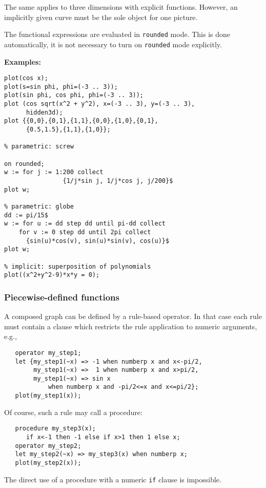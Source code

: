 The same applies to three dimensions with explicit functions. However, an
implicitly given curve must be the sole object for one picture.

The functional expressions are evaluated in \texttt{rounded} mode.
This is done automatically, it is not necessary to turn on
\texttt{rounded} mode explicitly.

\textbf{Examples:}
\begin{verbatim}
plot(cos x);
plot(s=sin phi, phi=(-3 .. 3));
plot(sin phi, cos phi, phi=(-3 .. 3));
plot (cos sqrt(x^2 + y^2), x=(-3 .. 3), y=(-3 .. 3),
      hidden3d);
plot {{0,0},{0,1},{1,1},{0,0},{1,0},{0,1},
      {0.5,1.5},{1,1},{1,0}};

% parametric: screw

on rounded;
w := for j := 1:200 collect
                {1/j*sin j, 1/j*cos j, j/200}$
plot w;

% parametric: globe
dd := pi/15$
w := for u := dd step dd until pi-dd collect
    for v := 0 step dd until 2pi collect
      {sin(u)*cos(v), sin(u)*sin(v), cos(u)}$
plot w;

% implicit: superposition of polynomials
plot((x^2+y^2-9)*x*y = 0);
\end{verbatim}


\subsubsection{Piecewise-defined functions}
A composed graph can be defined by a rule-based operator.  In that case each
rule must contain a clause which restricts the rule application to numeric
arguments, e.g.,
\begin{verbatim}
   operator my_step1;
   let {my_step1(~x) => -1 when numberp x and x<-pi/2,
        my_step1(~x) =>  1 when numberp x and x>pi/2,
        my_step1(~x) => sin x
            when numberp x and -pi/2<=x and x<=pi/2};
   plot(my_step1(x));
\end{verbatim}
Of course, such a rule may call a procedure:
\begin{verbatim}
   procedure my_step3(x);
      if x<-1 then -1 else if x>1 then 1 else x;
   operator my_step2;
   let my_step2(~x) => my_step3(x) when numberp x;
   plot(my_step2(x));
\end{verbatim}
The direct use of a procedure with a numeric \texttt{if} clause is impossible.

